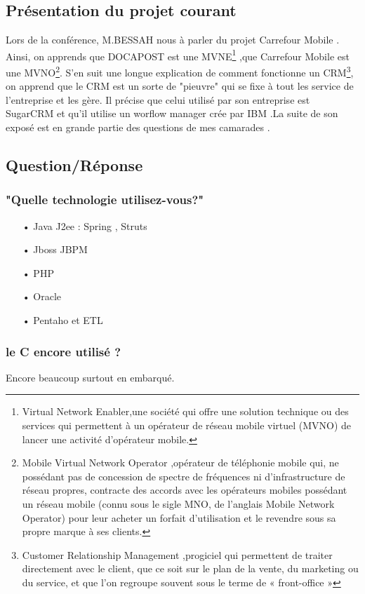  \subsection{Présentation du projet courant}
Lors de la conférence, M.BESSAH nous à parler du projet Carrefour Mobile . Ainsi, on apprends que DOCAPOST est une MVNE\footnote{Virtual Network Enabler,une société qui offre une solution technique ou des services qui permettent à un opérateur de réseau mobile virtuel (MVNO) de lancer une activité d'opérateur mobile.} ,que Carrefour Mobile est une MVNO\footnote{Mobile Virtual Network Operator ,opérateur de téléphonie mobile qui, ne possédant pas de concession de spectre de fréquences ni d'infrastructure de réseau propres, contracte des accords avec les opérateurs mobiles possédant un réseau mobile (connu sous le sigle MNO, de l'anglais Mobile Network Operator) pour leur acheter un forfait d'utilisation et le revendre sous sa propre marque à ses clients.}.
 S'en suit une longue explication de comment fonctionne un CRM\footnote{Customer Relationship Management ,progiciel qui permettent de traiter directement avec le client, que ce soit sur le plan de la vente, du marketing ou du service, et que l'on regroupe souvent sous le terme de « front-office » }, on apprend que le CRM est un sorte de "pieuvre" qui se fixe à tout les service de l'entreprise et les gère. Il précise que celui utilisé par son entreprise est SugarCRM et qu'il utilise un worflow manager crée par IBM .La suite de son exposé est en grande partie des questions de mes camarades .
 \subsection{Question/Réponse}
	\subsubsection{"Quelle technologie utilisez-vous?"}
	\begin{itemize}
		\item[•] Java J2ee : Spring , Struts
		\item[•] Jboss JBPM
		\item[•] PHP 
		\item[•] Oracle 
		\item[•] Pentaho et ETL
	\end{itemize}
	 \subsubsection{le C encore utilisé ?}
	Encore beaucoup surtout en embarqué.
	

